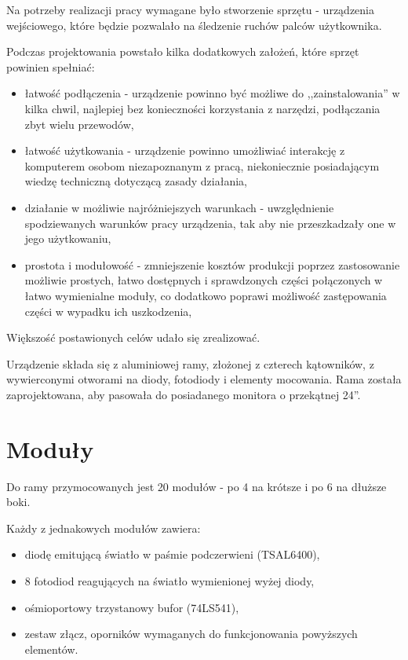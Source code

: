 \label{ch:hardware}

Na potrzeby realizacji pracy wymagane było stworzenie sprzętu - urządzenia wejściowego, które będzie pozwalało na śledzenie ruchów palców użytkownika.

Podczas projektowania powstało kilka dodatkowych założeń, które sprzęt powinien spełniać:
\begin{itemize}
 \item łatwość podłączenia - urządzenie powinno być możliwe do ,,zainstalowania'' w kilka chwil, najlepiej bez konieczności korzystania z narzędzi, podłączania zbyt wielu przewodów,
 \item łatwość użytkowania - urządzenie powinno umożliwiać interakcję z komputerem osobom niezapoznanym z pracą, niekoniecznie posiadającym wiedzę techniczną dotyczącą zasady działania,
 \item działanie w możliwie najróżniejszych warunkach - uwzględnienie spodziewanych warunków pracy urządzenia, tak aby nie przeszkadzały one w jego użytkowaniu,
 \item prostota i modułowość - zmniejszenie kosztów produkcji poprzez zastosowanie możliwie prostych, łatwo dostępnych i sprawdzonych części połączonych w łatwo wymienialne moduły, co dodatkowo poprawi możliwość zastępowania części w wypadku ich uszkodzenia,
\end{itemize}

Większość postawionych celów udało się zrealizować.

Urządzenie składa się z aluminiowej ramy, złożonej z czterech kątowników, z wywierconymi otworami na diody, fotodiody i elementy mocowania. Rama została zaprojektowana, aby pasowała do posiadanego monitora o przekątnej 24''.

\section{Moduły}

Do ramy przymocowanych jest 20 modułów - po 4 na krótsze i po 6 na dłuższe boki.

Każdy z jednakowych modułów zawiera:
\begin{itemize}
 \item diodę emitującą światło w paśmie podczerwieni (TSAL6400),
 \item 8 fotodiod reagujących na światło wymienionej wyżej diody,
 \item ośmioportowy trzystanowy bufor (74LS541),
 \item zestaw złącz, oporników wymaganych do funkcjonowania powyższych elementów.
\end{itemize}


